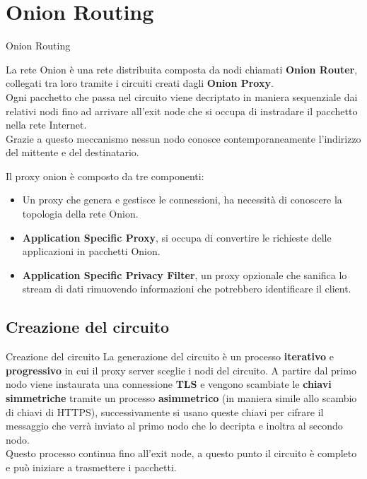 \section{Onion Routing}
\begin{frame}{Onion Routing}
    \begin{figure}[htpb!]
        \centering
        
    \end{figure}
    La rete Onion è una rete distribuita composta da nodi chiamati \textbf{Onion Router}, collegati tra loro tramite i circuiti creati dagli \textbf{Onion Proxy}. \\
    Ogni pacchetto che passa nel circuito viene decriptato in maniera sequenziale dai relativi nodi fino ad arrivare all'exit node che si occupa di instradare il pacchetto nella rete Internet. \\ 
    Grazie a questo meccanismo nessun nodo conosce contemporaneamente l'indirizzo del mittente e del destinatario.

\end{frame}

\begin{frame}
    Il proxy onion è composto da tre componenti:
    \begin{itemize}
        \item Un proxy che genera e gestisce le connessioni, ha necessità di conoscere la topologia della rete Onion.
        \item \textbf{Application Specific Proxy}, si occupa di convertire le richieste delle applicazioni in pacchetti Onion.
        \item \textbf{Application Specific Privacy Filter}, un proxy opzionale che sanifica lo stream di dati rimuovendo informazioni che potrebbero identificare il client.
    \end{itemize}
\end{frame}

\subsection{Creazione del circuito}
\begin{frame}{Creazione del circuito}
    La generazione del circuito è un processo \textbf{iterativo} e \textbf{progressivo} in cui il proxy server sceglie i nodi del circuito. A partire dal primo nodo viene instaurata una connessione \textbf{TLS} e vengono scambiate le \textbf{chiavi simmetriche} tramite un processo \textbf{asimmetrico} (in maniera simile allo scambio di chiavi di HTTPS), successivamente si usano queste chiavi per cifrare il messaggio che verrà inviato al primo nodo che lo decripta e inoltra al secondo nodo. \\
    Questo processo continua fino all'exit node, a questo punto il circuito è completo e può iniziare a trasmettere i pacchetti.
\end{frame}
    
